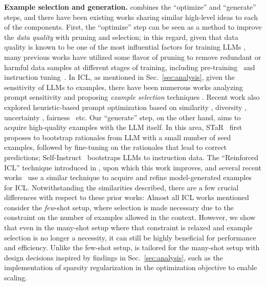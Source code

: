 \textbf{Example selection and generation.}
\ours combines the ``optimize'' and ``generate'' steps, and there have been existing works sharing similar high-level ideas to each of the components. First, the ``optimize'' step can be seen as a method to improve the \textit{data quality} with pruning and selection; in this regard, given that data quality is known to be one of the most influential factors for training LLMs \citep{xia2024less}, many previous works have utilized some flavor of pruning to remove redundant or harmful data samples at different stages of training, including pre-training~\citep{marion2023less} and instruction tuning~\citep{xia2024less}. In ICL, as mentioned in Sec.~\ref{sec:analysis}, given the sensitivity of LLMs to examples, there have been numerous works analyzing prompt sensitivity and proposing \textit{example selection} techniques \citep{zhao2021calibrate, lu-etal-2022-fantastically,zhou2024batch, wan2024teach}. Recent work also explored heuristic-based prompt optimization based on similarity \citep{rubin-etal-2022-learning, liu-etal-2022-makes}, diversity \citep{levy-etal-2023-diverse, xu2024context}, uncertainty \citep{wan-etal-2023-better, wan-etal-2023-universal}, fairness~\citep{zhou-etal-2024-fairer} etc. Our ``generate'' step, on the other hand, aims to acquire high-quality examples with the LLM itself. In this area, STaR~\citep{zelikman2022star} first proposes to bootstrap rationales from LLM with a small number of seed examples, followed by fine-tuning on the rationales that lead to correct predictions; Self-Instruct~\citep{wang-etal-2023-self-instruct} bootstraps LLMs to instruction data. The ``Reinforced ICL'' technique introduced in \citet{agarwal2024many}, upon which this work improves, and several recent works~\citep{chen-etal-2023-self, khattab2023dspy, opsahl2024optimizing} use a similar technique to acquire and refine model-generated examples for ICL. Notwithstanding the similarities described, there are a few crucial differences with respect to these prior works: Almost all ICL works mentioned consider the \textit{few}-shot setup, where selection is made necessary due to the constraint on the number of examples allowed in the context. However, we show that even in the many-shot setup where that constraint is relaxed and example selection is no longer a necessity, it can still be highly beneficial for performance and efficiency. Unlike the few-shot setup, \ours is tailored for the many-shot setup with design decisions inspired by findings in Sec.~\ref{sec:analysis}, such as the implementation of sparsity regularization in the optimization objective to enable scaling.